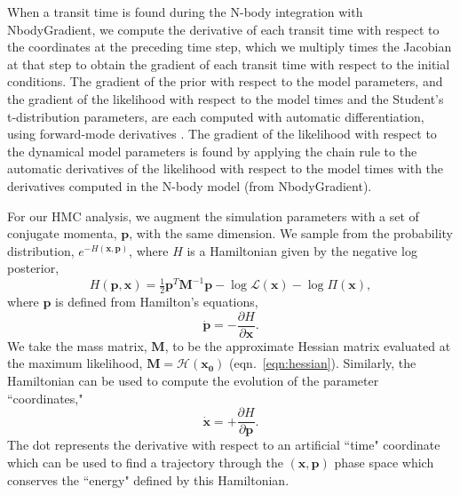 \documentclass[twocolumn]{aastex63}
\begin{document}
When a transit time is found during the N-body integration with \textsf{NbodyGradient}, we compute the derivative of each transit time with respect to
the coordinates at the preceding time step, which we multiply times the Jacobian
at that step to obtain the gradient of each transit time with respect to the
initial conditions.
The gradient of the prior with respect to the model parameters, and the gradient of the likelihood with respect to the model times and the Student's t-distribution parameters, are each computed with automatic
differentiation, using forward-mode derivatives  \citep{Revels2016}.  The gradient of the likelihood with
respect to the dynamical model parameters is found by applying the chain rule to the automatic derivatives of the likelihood with respect to the model times with the derivatives computed in the N-body model (from \textsf{NbodyGradient}).


For our HMC analysis, we augment the simulation parameters with a set of conjugate momenta, $\mathbf{p}$, with the same dimension. We sample from the probability distribution, $e^{-H(\mathbf{x},\mathbf{p})}$, where $H$ is a Hamiltonian given by the negative log posterior,
\begin{equation}
    H(\mathbf{p},\mathbf{x}) = \tfrac{1}{2} \mathbf{p}^T \mathbf{M}^{-1} \mathbf{p}
    - \log{\mathcal{L}}(\mathbf{x}) - \log{\Pi(\mathbf{x})},
\end{equation}
where $\mathbf{p}$ is defined from Hamilton's equations,
\begin{equation}
    \dot{\mathbf{p}} = -\frac{\partial H}{\partial \mathbf{x}}.
\end{equation}
We take the mass matrix, $\mathbf{M}$, to be the approximate Hessian matrix evaluated at the maximum likelihood, $\mathbf{M} = \mathbf{\mathcal{H}(\mathbf{x}_0)}$ (eqn.\ \ref{eqn:hessian}).
Similarly, the Hamiltonian can be used to compute the evolution of the parameter ``coordinates,"
\begin{equation}
    \dot{\mathbf{x}} = +\frac{\partial H}{\partial \mathbf{p}}.
\end{equation}
The dot represents the derivative with respect to an artificial ``time" coordinate which can be used to find a trajectory through the $(\mathbf{x},\mathbf{p})$ phase space which conserves the ``energy" defined by this Hamiltonian.
\end{document}
